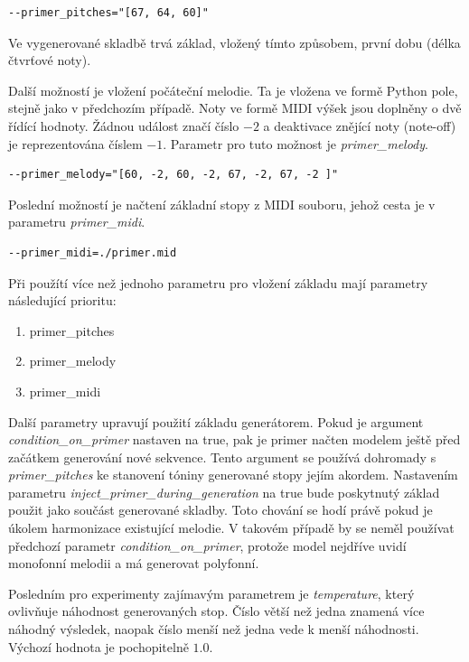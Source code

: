 \begin{verbatim}
--primer_pitches="[67, 64, 60]"
\end{verbatim}

Ve vygenerované skladbě trvá základ, 
vložený tímto způsobem, první dobu (délka čtvrťové noty).
\par

Další možností je vložení počáteční melodie.
Ta je vložena ve formě Python pole, stejně jako v předchozím případě.
Noty ve formě MIDI výšek jsou doplněny o dvě řídící hodnoty.
Žádnou událost značí číslo $-2$ a 
deaktivace znějící noty (note-off) je reprezentována číslem $-1$.
Parametr pro tuto možnost je \emph{primer\_melody}.

\begin{verbatim}
--primer_melody="[60, -2, 60, -2, 67, -2, 67, -2 ]"  
\end{verbatim}

Poslední možností je načtení základní stopy z MIDI souboru,
jehož cesta je v parametru \emph{primer\_midi}.
\begin{verbatim}
--primer_midi=./primer.mid 
\end{verbatim}

Při použítí více než jednoho parametru pro vložení základu
mají parametry následující prioritu:
\begin{enumerate}
    \item primer\_pitches
    \item primer\_melody
    \item primer\_midi
\end{enumerate}
\par

Další parametry upravují použití základu generátorem.
Pokud je argument \emph{condition\_on\_primer} nastaven na true, 
pak je primer načten modelem ještě před začátkem generování nové sekvence.
Tento argument se používá dohromady s \emph{primer\_pitches} 
ke stanovení tóniny generované stopy jejím akordem.
Nastavením parametru \emph{inject_primer_during_generation} na true
bude poskytnutý základ použit jako součást generované skladby.
Toto chování se hodí právě pokud je úkolem harmonizace existující melodie.
V takovém případě by se neměl používat předchozí parametr \emph{condition\_on\_primer},
protože model nejdříve uvidí monofonní melodii 
a má generovat polyfonní.
\cite{google_git_polyphony}

\par
Posledním pro experimenty zajímavým parametrem je \emph{temperature},
který ovlivňuje náhodnost generovaných stop.
Číslo větší než jedna znamená více náhodný výsledek,
naopak číslo menší než jedna vede k menší náhodnosti.
Výchozí hodnota je pochopitelně $1.0$.
\par

